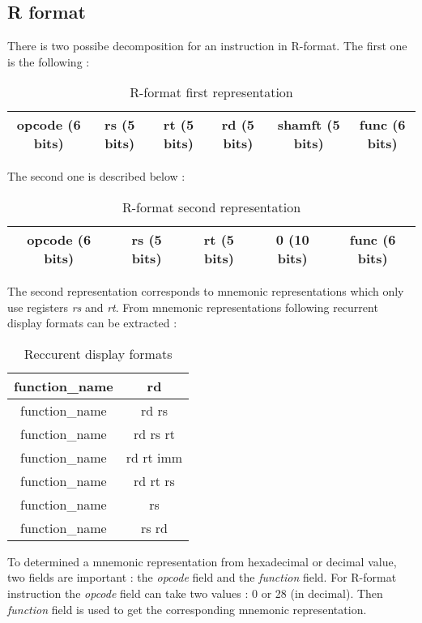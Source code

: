\subsection*{R format}

	There is two possibe decomposition for an instruction in R-format. The first one is the following : 
	
	\begin{table}[H]
	\centering
		\begin{tabular}{|c|c|c|c|c|c|}
			\hline 
	opcode (6 bits) & rs (5 bits) & rt (5 bits) & rd (5 bits) & shamft (5 bits) & func (6 bits) \\ 
			\hline 
		\end{tabular} 
		\caption{R-format first representation}
	\end{table}
	
	The second one is described below :
	\begin{table}[H]
		\centering
		\begin{tabular}{|c|c|c|c|c|}
			\hline 
	opcode (6 bits) & rs (5 bits) & rt (5 bits) & 0 (10 bits) & func (6 bits) \\ 
			\hline 
		\end{tabular} 
		\caption{R-format second representation}
	\end{table}
	
	The second representation corresponds to mnemonic representations which only use registers \textit{rs} and \textit{rt}. From mnemonic representations following recurrent display formats can be extracted :
	
	\begin{table}[H]
	\centering
	\begin{tabular}{|c|c|}
	\hline 
	function\_name & rd \\ 
	\hline 
	function\_name & rd rs \\ 
	\hline 
	function\_name & rd rs rt \\ 
	\hline 
	function\_name & rd rt imm \\ 
	\hline 
	function\_name & rd rt rs \\ 
	\hline 
	function\_name & rs \\ 
	\hline 
	function\_name & rs rd \\ 
	\hline 
	\end{tabular}
	\caption{Reccurent display formats}
	\end{table}
	
	To determined a mnemonic representation from hexadecimal or decimal value, two fields are important : the \textit{opcode} field and the \textit{function} field. For R-format instruction the \textit{opcode} field can take two values : 0 or 28 (in decimal). Then \textit{function} field is used to get the corresponding mnemonic representation.